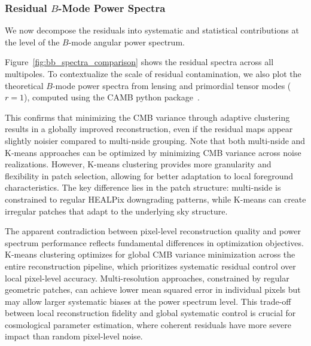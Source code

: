 \documentclass[fleqn,usenatbib]{mnras}
\begin{document}
\subsubsection*{Residual \( B \)-Mode Power Spectra}
\label{subsec:residual_bb_spectra}

We now decompose the residuals into systematic and statistical contributions at the level of the \( B \)-mode angular power spectrum.

Figure~\ref{fig:bb_spectra_comparison} shows the residual spectra across all multipoles.  
To contextualize the scale of residual contamination, we also plot the theoretical \( B \)-mode power spectra from lensing and primordial tensor modes (\( r=1 \)), computed using the CAMB python package~\citep{CAMB}.

This confirms that minimizing the CMB variance through adaptive clustering results in a globally improved reconstruction, even if the residual maps appear slightly noisier compared to multi-nside grouping. Note that both multi-nside and K-means approaches can be optimized by minimizing CMB variance across noise realizations. However, K-means clustering provides more granularity and flexibility in patch selection, allowing for better adaptation to local foreground characteristics. The key difference lies in the patch structure: multi-nside is constrained to regular HEALPix downgrading patterns, while K-means can create irregular patches that adapt to the underlying sky structure.

The apparent contradiction between pixel-level reconstruction quality and power spectrum performance reflects fundamental differences in optimization objectives. K-means clustering optimizes for global CMB variance minimization across the entire reconstruction pipeline, which prioritizes systematic residual control over local pixel-level accuracy. Multi-resolution approaches, constrained by regular geometric patches, can achieve lower mean squared error in individual pixels but may allow larger systematic biases at the power spectrum level. This trade-off between local reconstruction fidelity and global systematic control is crucial for cosmological parameter estimation, where coherent residuals have more severe impact than random pixel-level noise.
\end{document}
